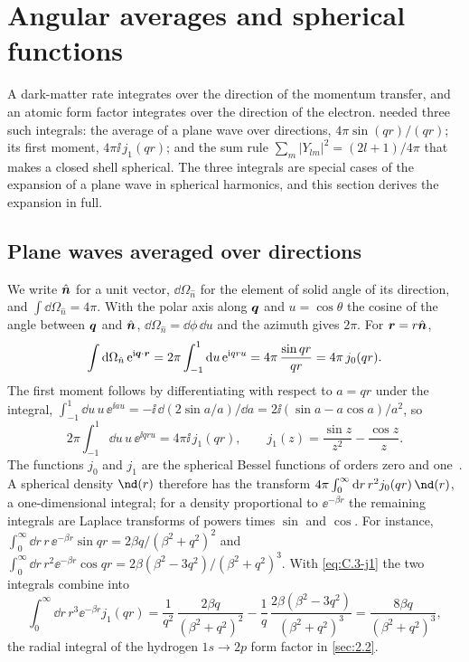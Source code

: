 \section{Angular averages and spherical functions}\label{app:C.3}

A dark-matter rate integrates over the direction of the momentum transfer, and an atomic form factor integrates over the direction of the electron.  needed three such integrals: the average of a plane wave over directions, $4\pi\sin(qr)/(qr)$; its first moment, $4\pi\ii\,j_1(qr)$; and the sum rule $\sum_m|Y_{lm}|^2 = (2l + 1)/4\pi$ that makes a closed shell spherical. The three integrals are special cases of the expansion of a plane wave in spherical harmonics, and this section derives the expansion in full.

\subsection{Plane waves averaged over directions}

We write $\hat{\bm{n}}$ for a unit vector, $\dd\Omega_{\hat n}$ for the element of solid angle of its direction, and $\int\dd\Omega_{\hat n} = 4\pi$. With the polar axis along $\bm{q}$ and $u = \cos\theta$ the cosine of the angle between $\bm{q}$ and $\hat{\bm{n}}$, $\dd\Omega_{\hat n} = \dd\phi\,\dd u$ and the azimuth gives $2\pi$. For $\bm{r} = r\hat{\bm{n}}$,
\begin{equation}
  \int\mathrm{d}\Omega_{\hat n}\,\mathrm{e}^{\mathrm{i}\bm{q}\cdot\bm{r}} = 2\pi\int_{-1}^{1}\mathrm{d} u\,\mathrm{e}^{\mathrm{i} qru} = 4\pi\,\frac{\sin qr}{qr} = 4\pi\,j_0(qr) .
  \label{eq:C.3-j0}
\end{equation}
The first moment follows by differentiating with respect to $a = qr$ under the integral, $\int_{-1}^{1}\dd u\,u\,\ee^{\ii au} = -\ii\,\dd(2\sin a/a)/\dd a = 2\ii(\sin a - a\cos a)/a^2$, so
\begin{equation}
  2\pi\int_{-1}^{1}\dd u\,u\,\ee^{\ii qru} = 4\pi\ii\,j_1(qr), \qquad j_1(z) = \frac{\sin z}{z^2} - \frac{\cos z}{z} .
  \label{eq:C.3-j1}
\end{equation}
The functions $j_0$ and $j_1$ are the spherical Bessel functions of orders zero and one~\cite[Eq.~(10.49.3)]{olver2010nist}. A spherical density $\nd(r)$ therefore has the transform $4\pi\int_0^\infty\dd r\,r^2 j_0(qr)\,\nd(r)$, a one-dimensional integral; for a density proportional to $\ee^{-\beta r}$ the remaining integrals are Laplace transforms of powers times $\sin$ and $\cos$. For instance, $\int_0^\infty\dd r\,r\,\ee^{-\beta r}\sin qr = 2\beta q/(\beta^2 + q^2)^2$ and $\int_0^\infty\dd r\,r^2\ee^{-\beta r}\cos qr = 2\beta(\beta^2 - 3q^2)/(\beta^2 + q^2)^3$. With \cref{eq:C.3-j1} the two integrals combine into
\begin{equation*}
  \int_0^\infty\dd r\,r^3\ee^{-\beta r}j_1(qr) = \frac{1}{q^2}\,\frac{2\beta q}{(\beta^2 + q^2)^2} - \frac{1}{q}\,\frac{2\beta(\beta^2 - 3q^2)}{(\beta^2 + q^2)^3} = \frac{8\beta q}{(\beta^2 + q^2)^3} ,
\end{equation*}
the radial integral of the hydrogen $1s \to 2p$ form factor in \cref{sec:2.2}.

